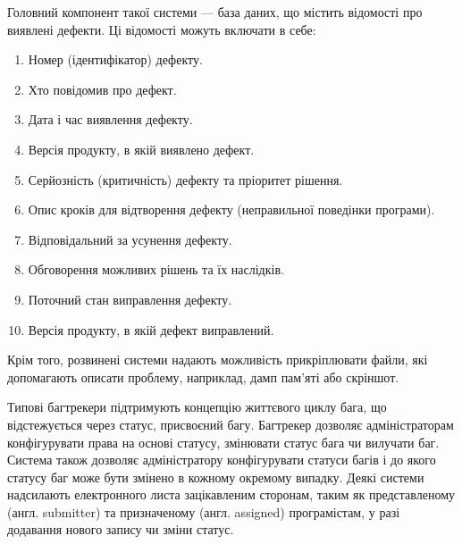 \documentclass[../main.tex]{subfiles}
\begin{document}
Головний компонент такої системи — база даних, що містить відомості про виявлені дефекти. Ці відомості можуть включати в себе:
\begin{enumerate}
	\item Номер (ідентифікатор) дефекту.
	\item Хто повідомив про дефект.
	\item Дата і час виявлення дефекту.
	\item Версія продукту, в якій виявлено дефект.
	\item Серйозність (критичність) дефекту та пріоритет рішення.
	\item Опис кроків для відтворення дефекту (неправильної поведінки програми).
	\item Відповідальний за усунення дефекту.
	\item Обговорення можливих рішень та їх наслідків.
	\item Поточний стан виправлення дефекту.
	\item Версія продукту, в якій дефект виправлений.
\end{enumerate}
Крім того, розвинені системи надають можливість прикріплювати файли, які допомагають описати проблему, наприклад, дамп пам'яті або скріншот.

Типові багтрекери підтримують концепцію життєвого циклу бага, що відстежується через статус, присвоєний багу. Багтрекер дозволяє адміністраторам конфігурувати права на основі статусу, змінювати статус бага чи вилучати баг. Система також дозволяє адміністратору конфігурувати статуси багів і до якого статусу баг може бути змінено в кожному окремому випадку. Деякі системи надсилають електронного листа зацікавленим сторонам, таким як представленому (англ. submitter) та призначеному (англ. assigned) програмістам, у разі додавання нового запису чи зміни статус.
\end{document}
